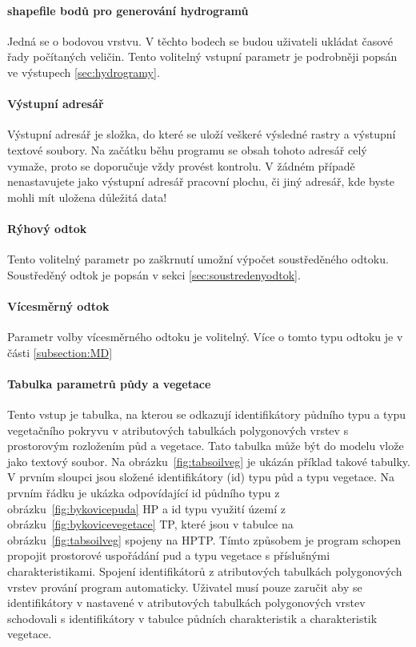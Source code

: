 \paragraph{shapefile bodů pro generování hydrogramů} \label{sec:vstupbody}

Jedná  se o bodovou vrstvu. V těchto bodech se budou uživateli ukládat časové řady počítaných veličin. Tento volitelný vstupní parametr je podrobněji popsán ve výstupech \ref{sec:hydrogramy}.

\paragraph{Výstupní adresář} \label{sec:vstupadresar}
Výstupní adresář je složka, do které se uloží veškeré výsledné rastry a výstupní textové soubory. Na začátku běhu programu se obsah tohoto adresář celý vymaže, proto se doporučuje vždy provést kontrolu. V žádném případě nenastavujete jako výstupní adresář pracovní plochu, či jiný adresář, kde byste mohli mít uložena důležitá data!

\paragraph{Rýhový odtok} \label{sec:vstupryhovy}

Tento volitelný parametr po zaškrnutí umožní výpočet soustředěného odtoku. Soustředěný odtok je popsán v sekci \ref{sec:soustredenyodtok}.

\paragraph{Vícesměrný odtok} \label{sec:vstupvicesmerny}

Parametr volby vícesměrného odtoku je volitelný. Více o tomto typu odtoku je v části \ref{subsection:MD}

\paragraph{Tabulka parametrů půdy a vegetace}  \label{sec:upravatabulkyparametru}

Tento vstup je tabulka, na kterou se odkazují identifikátory půdního typu a typu vegetačního pokryvu v atributových tabulkách polygonových vrstev s prostorovým rozložením půd a vegetace. Tato tabulka může být do modelu vlože jako textový soubor. Na obrázku~\ref{fig:tabsoilveg} je ukázán příklad takové tabulky. V prvním sloupci jsou složené identifikátory (id) typu půd a typu vegetace. Na prvním řádku je ukázka odpovídající id půdního typu z obrázku~\ref{fig:bykovicepuda} HP a id typu využití území z obrázku~\ref{fig:bykovicevegetace} TP, které jsou v tabulce na obrázku~\ref{fig:tabsoilveg} spojeny na HPTP. Tímto způsobem je program schopen propojit prostorové uspořádání pud a typu vegetace s příslušnými charakteristikami. Spojení identifikátorů z atributových tabulkách polygonových vrstev prování program automaticky. Uživatel musí pouze zaručit aby se identifikátory v nastavené v atributových tabulkách polygonových vrstev schodovali s identifikátory v tabulce půdních charakteristik a charakteristik vegetace. 

